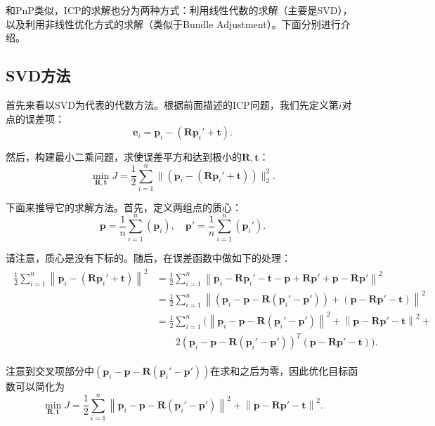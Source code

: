 和PnP类似，ICP的求解也分为两种方式：利用线性代数的求解（主要是SVD）， 以及利用非线性优化方式的求解（类似于Bundle Adjustment）。下面分别进行介绍。

\subsection{SVD方法}
首先来看以SVD为代表的代数方法。根据前面描述的ICP问题，我们先定义第$i$对点的误差项：
\begin{equation}
\bm{e}_i = \bm{p}_i - (\bm{R} \bm{p}_i' + \bm{t} ) .
\end{equation}

然后，构建最小二乘问题，求使误差平方和达到极小的$\bm{R}, \bm{t}$：
\begin{equation}
\mathop {\min }\limits_{\bm{R}, \bm{t}} J = \frac{1}{2} \sum\limits_{i = 1}^n\| {\left( {{\bm{p}_i} - \left( {\bm{R}{\bm{p}_i}' + \bm{t}} \right)} \right)} \|^2_2.
\end{equation}

下面来推导它的求解方法。首先，定义两组点的质心：
\begin{equation}
\bm{p} = \frac{1}{n}\sum_{i=1}^n ( \bm{p}_i ), \quad \bm{p}' = \frac{1}{n} \sum_{i=1}^n ( \bm{p}_i' ). 
\end{equation}

请注意，质心是没有下标的。随后，在误差函数中做如下的处理：
\begin{align*}
\begin{array}{ll}
\frac{1}{2}\sum\limits_{i = 1}^n {{{\left\| {{\bm{p}_i} - \left( {\bm{R}{ \bm{p}_i}' + \bm{t}} \right)} \right\|}^2}}  & = \frac{1}{2}\sum\limits_{i = 1}^n {{{\left\| {{\bm{p}_i} - \bm{R}{\bm{p}_i}' - \bm{t} - \bm{p} + \bm{Rp}' + \bm{p} - \bm{Rp}'} \right\|}^2}} \\
 & = \frac{1}{2}\sum\limits_{i = 1}^n {{{\left\| {\left( {{\bm{p}_i} - \bm{p} - \bm{R}\left( {{\bm{p}_i}' - \bm{p}'} \right)} \right) + \left( {\bm{p} - \bm{Rp}' - \bm{t}} \right)} \right\|}^2}} \\
& = \frac{1}{2}\sum\limits_{i = 1}^n ( {{\left\| {{\bm{p}_i} - \bm{p} - \bm{R}\left( {{\bm{p}_i}' - \bm{p}'} \right)} \right\|}^2} + {{\left\| {\bm{p} - \bm{Rp}' - \bm{t}} \right\|}^2} +\\
 & \quad \quad 2{{\left( {{\bm{p}_i} - \bm{p} - \bm{R}\left( {{\bm{p}_i}' - \bm{p}'} \right)} \right)}^T}\left( {\bm{p} - \bm{Rp}' - \bm{t}} \right)). 
\end{array}
\end{align*}

注意到交叉项部分中$\left( {{\bm{p}_i} - \bm{p} - \bm{R}\left( {{\bm{p}_i}' - \bm{p}'} \right)} \right)$在求和之后为零，因此优化目标函数可以简化为
\begin{equation}
\mathop {\min }\limits_{\bm{R}, \bm{t}} J = \frac{1}{2}\sum\limits_{i = 1}^n {{\left\| {{\bm{p}_i} - \bm{p} - \bm{R}\left( {{\bm{p}_i}' - \bm{p}'} \right)} \right\|}^2} + {{\left\| {\bm{p} - \bm{Rp}' - \bm{t}} \right\|}^2} .
\end{equation}

